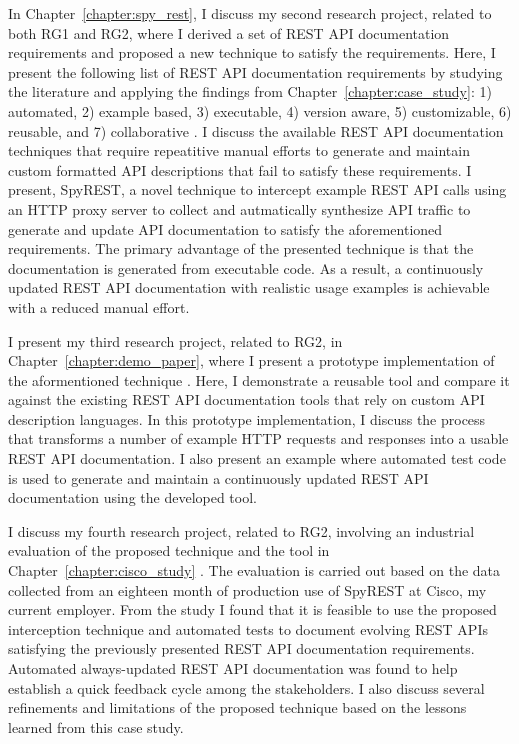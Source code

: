 In Chapter~\ref{chapter:spy_rest}, I discuss my second research project, related to both RG1 and RG2, where I derived a set of REST API documentation requirements and proposed a new technique to satisfy the requirements. Here, I present the following list of REST API documentation requirements by studying the literature and applying the findings from Chapter~\ref{chapter:case_study}: 1) automated, 2) example based, 3) executable, 4) version aware, 5) customizable, 6) reusable, and 7) collaborative \cite{sohan2015spyrest}. I discuss the available REST API documentation techniques that require repeatitive manual efforts to generate and maintain custom formatted API descriptions that fail to satisfy these requirements. I present, SpyREST, a novel technique to intercept example REST API calls using an HTTP proxy server to collect and autmatically synthesize API traffic to generate and update API documentation to satisfy the aforementioned requirements. The primary advantage of the presented technique is that the documentation is generated from executable code. As a result, a continuously updated REST API documentation with realistic usage examples is achievable with a reduced manual effort.

I present my third research project, related to RG2, in Chapter~\ref{chapter:demo_paper}, where I present a prototype implementation of the aformentioned technique \cite{sohan2015spyrest_tool}. Here, I demonstrate a reusable tool and compare it against the existing REST API documentation tools that rely on custom API description languages. In this prototype implementation, I discuss the process that transforms a number of example HTTP requests and responses into a usable REST API documentation. I also present an example where automated test code is used to generate and maintain a continuously updated REST API documentation using the developed tool.

I discuss my fourth research project, related to RG2, involving an industrial evaluation of the proposed technique and the tool in Chapter~\ref{chapter:cisco_study} \cite{sohan_cisco}. The evaluation is carried out based on the data collected from an eighteen month of production use of SpyREST at Cisco, my current employer. From the study I found that it is feasible to use the proposed interception technique and automated tests to document evolving REST APIs satisfying the previously presented REST API documentation requirements. Automated always-updated REST API documentation was found to help establish a quick feedback cycle among the stakeholders. I also discuss several refinements and limitations of the proposed technique based on the lessons learned from this case study.

